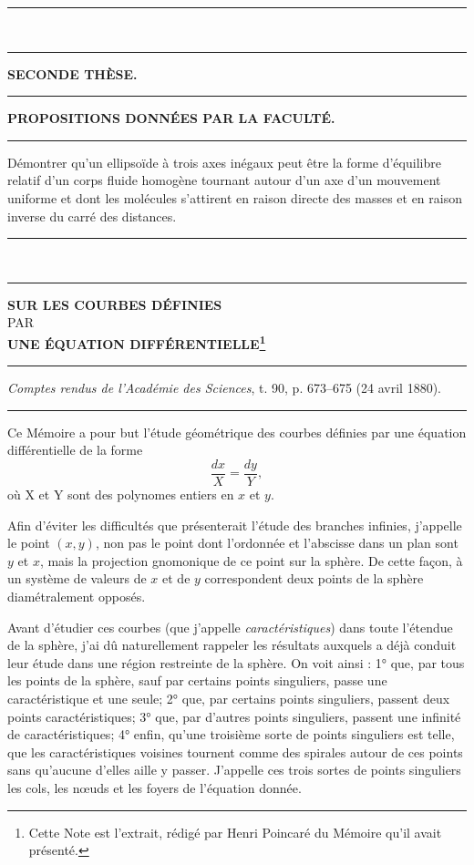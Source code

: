 \documentclass[11pt]{article}
\newcommand{\ornament}{\begin{center}\rule{2.5em}{0.4pt}\,\raisebox{0.1ex}{\tiny$\bullet\bullet\bullet$}\,\rule{2.5em}{0.4pt}\end{center}}
\newcommand{\shortline}{\begin{center}\rule{3.5em}{0.4pt}\end{center}}
\begin{document}
\ornament





\renewcommand{\thefootnote}{(\arabic{footnote})}
\begin{center}
{\bfseries SECONDE THÈSE.}
\end{center}

\shortline

\begin{center}
{\Large\bfseries PROPOSITIONS DONNÉES PAR LA FACULTÉ.}
\end{center}

\shortline

Démontrer qu’un ellipsoïde à trois axes inégaux peut être la forme d’équilibre relatif d’un corps fluide homogène tournant autour d’un axe d’un mouvement uniforme et dont les molécules s’attirent en raison directe des masses et en raison inverse du carré des distances.

\ornament

\clearpage

\begin{center}
{\Large\bfseries SUR LES COURBES DÉFINIES}\\[1.2em]
{\small PAR}\\[1.2em]
{\large\bfseries UNE ÉQUATION DIFFÉRENTIELLE\footnote{Cette Note est l’extrait, rédigé par Henri Poincaré du Mémoire qu’il avait présenté.}}
\end{center}

\shortline

\begin{center}
\emph{Comptes rendus de l’Académie des Sciences}, t. 90, p. 673--675 (24 avril 1880).
\end{center}

\shortline

Ce Mémoire a pour but l’étude géométrique des courbes définies par une équation différentielle de la forme
\[
\frac{dx}{X}=\frac{dy}{Y},
\]
où X et Y sont des polynomes entiers en $x$ et $y$.

Afin d’éviter les difficultés que présenterait l’étude des branches infinies, j’appelle le point $(x,y)$, non pas le point dont l’ordonnée et l’abscisse dans un plan sont $y$ et $x$, mais la projection gnomonique de ce point sur la sphère. De cette façon, à un système de valeurs de $x$ et de $y$ correspondent deux points de la sphère diamétralement opposés.

Avant d’étudier ces courbes (que j’appelle \emph{caractéristiques}) dans toute l’étendue de la sphère, j’ai dû naturellement rappeler les résultats auxquels a déjà conduit leur étude dans une région restreinte de la sphère. On voit ainsi : 1° que, par tous les points de la sphère, sauf par certains points singuliers, passe une caractéristique et une seule; 2° que, par certains points singuliers, passent deux points caractéristiques; 3° que, par d’autres points singuliers, passent une infinité de caractéristiques; 4° enfin, qu’une troisième sorte de points singuliers est telle, que les caractéristiques voisines tournent comme des spirales autour de ces points sans qu’aucune d’elles aille y passer. J’appelle ces trois sortes de points singuliers les cols, les nœuds et les foyers de l’équation donnée.
\end{document}
